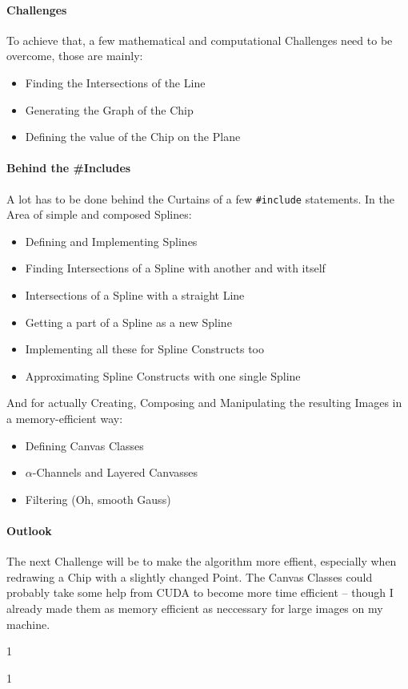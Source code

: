 \documentclass[10pt]{article}
\newcommand\behindIncludes{1}
\begin{document}
\paragraph{Challenges}
    To achieve that, a few mathematical and computational Challenges need to be overcome, those are mainly:
    \begin{itemize}
        \item Finding the Intersections of the Line
        \item Generating the Graph of the Chip
        \item Defining the value of the Chip on the Plane
    \end{itemize}
\paragraph{Behind the \#Includes}
    A lot has to be done behind the Curtains of a few {\tt \#include} statements.
    In the Area of simple and composed Splines:
    \begin{itemize}
        \item Defining and Implementing Splines
        \item Finding Intersections of a Spline with another and with itself
        \item Intersections of a Spline with a straight Line
        \item Getting a part of a Spline as a new Spline
        \item Implementing all these for Spline Constructs too
        \item Approximating Spline Constructs with one single Spline
    \end{itemize}
    And for actually Creating, Composing and Manipulating the resulting Images in a memory-efficient way:
    \begin{itemize}
        \item Defining Canvas Classes
        \item $\alpha$-Channels and Layered Canvasses
        \item Filtering (Oh, smooth Gauss)
    \end{itemize}
\paragraph{Outlook}
    The next Challenge will be to make the algorithm more effient, especially when redrawing a Chip with a slightly changed Point.
    The Canvas Classes could probably take some help from CUDA to become more time efficient – though I already made them as memory efficient as neccessary for large images on my machine.

\if\behindIncludes1\fi

\newpage

\newpage
\if\behindIncludes1\fi
\end{document}
